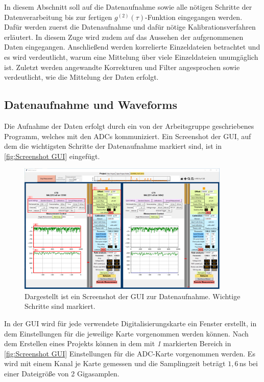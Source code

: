 In diesem Abschnitt soll auf die Datenaufnahme sowie alle nötigen Schritte der Datenverarbeitung bis zur fertigen $g^{(2)}(\tau)$-Funktion eingegangen werden. 
Dafür werden zuerst die Datenaufnahme und dafür nötige Kalibrationsverfahren erläutert. 
In diesem Zuge wird zudem auf das Aussehen der aufgenommenen Daten eingegangen. 
Anschließend werden korrelierte Einzeldateien betrachtet und es wird verdeutlicht, warum eine Mittelung über viele Einzeldateien unumgäglich ist. 
Zuletzt werden angewandte Korrekturen und Filter angesprochen sowie verdeutlicht, wie die Mittelung der Daten erfolgt. 

\subsection{Datenaufnahme und Waveforms}
\label{ssec:Datenaufnahme und Waveforms}
Die Aufnahme der Daten erfolgt durch ein von der Arbeitsgruppe geschriebenes Programm, welches mit den ADCs kommuniziert. Ein Screenshot der GUI, auf dem die wichtigsten Schritte der Datenaufnahme markiert sind, ist in \autoref{fig:Screenshot GUI} eingefügt. 
\begin{figure}[h]
    \centering
    \includegraphics[width=0.9\textwidth]{images/Datenaufnahme/GUI.pdf}
    \caption{Dargestellt ist ein Screenshot der GUI zur Datenaufnahme. Wichtige Schritte sind markiert.}
    \label{fig:Screenshot GUI}
\end{figure}
In der GUI wird für jede verwendete Digitalisierungskarte ein Fenster erstellt, in dem Einstellungen für die jeweilige Karte vorgenommen werden können. 
Nach dem Erstellen eines Projekts können in dem mit \emph{1} markierten Bereich in \autoref{fig:Screenshot GUI} Einstellungen für die ADC-Karte vorgenommen werden. 
Es wird mit einem Kanal je Karte gemessen und die Samplingzeit beträgt $1{,}6$\,ns bei einer Dateigröße von 2 Gigasamplen. 
